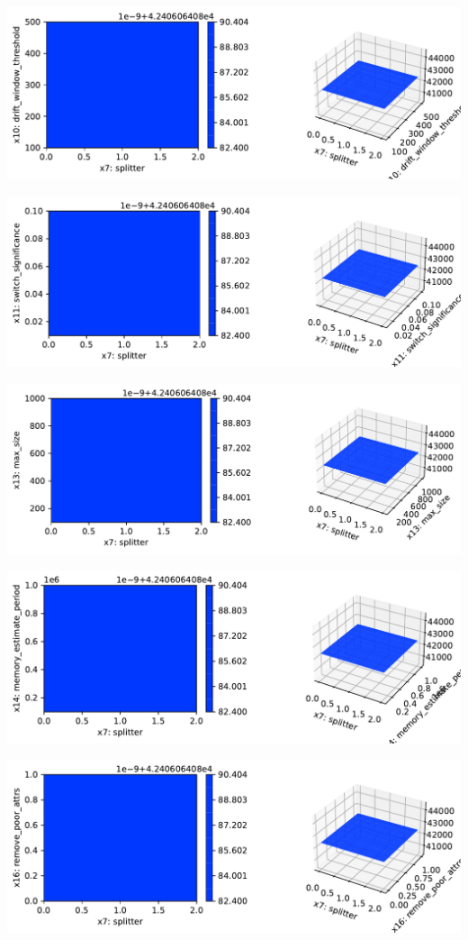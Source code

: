 \documentclass[
  letterpaper,
  DIV=11,
  numbers=noendperiod]{scrreprt}
\begin{document}
\includegraphics{024_spot_hpt_river_friedman_hatr_files/figure-pdf/cell-42-output-80.pdf}

\includegraphics{024_spot_hpt_river_friedman_hatr_files/figure-pdf/cell-42-output-81.pdf}

\includegraphics{024_spot_hpt_river_friedman_hatr_files/figure-pdf/cell-42-output-82.pdf}

\includegraphics{024_spot_hpt_river_friedman_hatr_files/figure-pdf/cell-42-output-83.pdf}

\includegraphics{024_spot_hpt_river_friedman_hatr_files/figure-pdf/cell-42-output-84.pdf}
\end{document}
